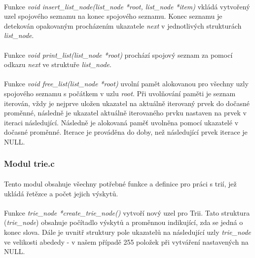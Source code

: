 ﻿\documentclass[12pt, a4paper]{article}
\begin{document}
\paragraph{}
Funkce \textit{void insert\_list\_node(list\_node *root, list\_node *item)} vkládá vytvořený uzel spojového seznamu na konec spojového seznamu. Konec seznamu je detekován opakovaným procházením ukazatele \textit{next} v jednotlivých strukturách \textit{list\_node}.

\paragraph{}
Funkce \textit{void print\_list(list\_node *root)} prochází spojový seznam za pomocí odkazu \textit{next} ve struktuře \textit{list\_node}. 

\paragraph{}
Funkce \textit{void free\_list(list\_node *root)} uvolní pamět alokovanou pro všechny uzly spojového seznamu s počátkem v uzlu \textit{root}. Při uvolňování paměti je seznam iterován, vždy je nejprve uložen ukazatel na aktuálně iterovaný prvek do dočasné proměnné, následně je ukazatel aktuálně iterovaného prvku nastaven na prvek v iteraci následující. Následně je alokovaná paměť uvolněna pomocí ukazatelé v dočasné proměnné. Iterace je prováděna do doby, než následující prvek iterace je NULL.


\subsubsection{Modul trie.c}
\paragraph{}
Tento modul obsahuje všechny potřebné funkce a definice pro práci s trií, jež ukládá řetězce a počet jejich výskytů.

\paragraph{}
Funkce \textit{trie\_node *create\_trie\_node()} vytvoří nový uzel pro Trii. Tato struktura (\textit{trie\_node}) obsahuje počítadlo výskytů a proměnnou indikující, zda se jedná o konec slova. Dále je uvnitř struktury pole ukazatelů na následující uzly \textit{trie\_node} ve velikosti abededy - v našem případě 255 položek při vytváření nastavených na NULL.
\end{document}
